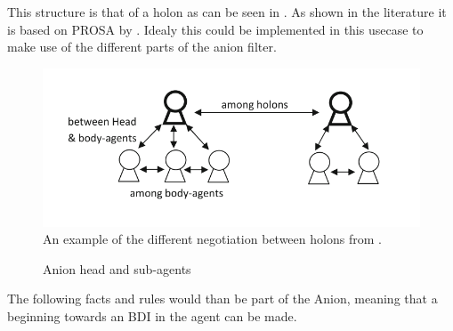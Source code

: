 This structure is that of a holon as can be seen in . As shown in the literature it is based on PROSA by \citep{van1998reference}. Idealy this could be implemented in this usecase to make use of the different parts of the anion filter.
\begin{figure}[h]
	\centering
	\includegraphics[width=0.7\linewidth]{img/holon_example}
	\caption{An example of the different negotiation between holons from \citet{beheshti2016negotiations}.}
	\label{fig:holonexample}
\end{figure}


\begin{figure}[h]
	
	\centering
	\caption{Anion head and sub-agents}
	\label{fig:anion-head-sub}
	
\end{figure}

The following facts and rules would than be part of the Anion, meaning that a beginning towards an BDI in the agent can be made.

